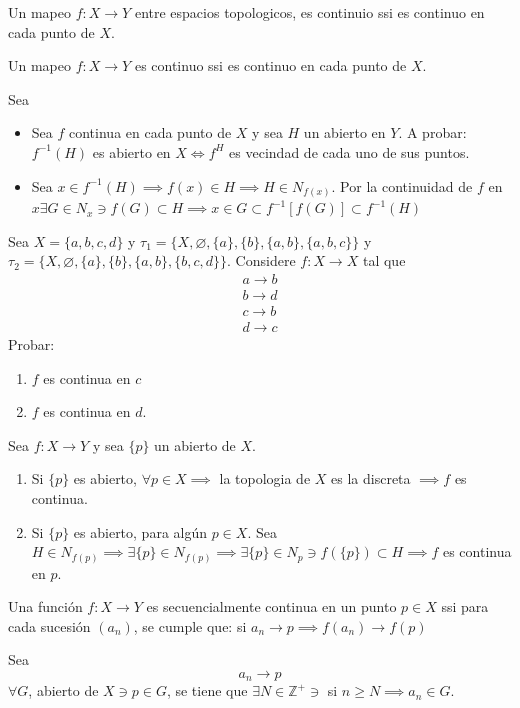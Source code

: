 \begin{teorema}
    Un mapeo $f:X\to Y$ entre espacios topologicos, es continuio ssi es continuo en cada punto de $X$. 
\end{teorema}
\begin{teorema}
    Un mapeo $f:X\to Y$ es continuo ssi es continuo en cada punto de $X$. 
    \begin{dem}
        Sea 
        \begin{itemize}
            \item Sea $f$ continua en cada punto de $X$ y sea $H$ un abierto en $Y$. A probar: $f^{-1}(H)$ es abierto en $X\iff f^{H}$ es vecindad de cada uno de sus puntos. 
            \item Sea $x\in f^{-1}(H) \implies f(x)\in H\implies H\in N_{f(x)}$. Por la continuidad de $f$ en $x\exists G\in N_x\ni f(G)\subset H\implies x\in G\subset f^{-1}[f(G)]\subset f^{-1}(H)$
        \end{itemize}
    \end{dem}
\end{teorema}

\begin{ejemplo}
    Sea $X=\{a,b,c,d\}$ y $\tau_1=\{X,\varnothing, \{a\},\{b\},\{a,b\},\{a,b,c\} \}$ y $\tau_2=\{X,\varnothing, \{a\},\{b\},\{a,b\},\{b,c,d\} \}$. Considere $f:X\to X$ tal que \begin{align*}
        a\to b\\
        b\to d\\
        c\to b\\
        d\to c
    \end{align*}
    Probar: 
    \begin{enumerate}
        \item $f$ es continua en $c$
        \item $f$ es continua en $d$. 
    \end{enumerate}
\end{ejemplo}

\begin{ejemplo}
    Sea $f:X\to Y$ y sea $\{p\}$ un abierto de $X$. 
    \begin{enumerate}
        \item Si $\{p\}$ es abierto, $\forall p\in X\implies$ la topologia de $X$ es la discreta $\implies f$ es continua. 
        \item Si $\{p\}$ es abierto, para algún $p\in X$. Sea $H\in N_{f(p)}\implies \exists \{p\}\in N_{f(p)}\implies \exists \{p\}\in N_p\ni f(\{p\})\subset H\implies f$ es continua en $p$. 
    \end{enumerate}
\end{ejemplo}
\begin{definicion}
    Una función $f:X\to Y$ es secuencialmente continua en un punto $p\in X$ ssi para cada sucesión $(a_n)$, se cumple que: si $a_n\to p\implies f(a_n)\to f(p)$
    \begin{cajita}
        Sea
        $$a_n\to p$$
        $\forall G$, abierto de $X\ni p\in G$, se tiene que $\exists N\in \mathbb{Z}^+\ni$ si $n\geq N\implies a_n\in G$. 
    \end{cajita}
\end{definicion}

